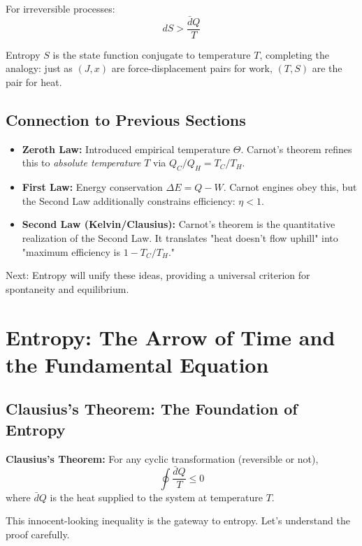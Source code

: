 \documentclass[9pt,twocoloumn]{article}
\begin{document}
For irreversible processes:
\begin{equation}
dS > \frac{\bar{d}Q}{T}
\end{equation}

Entropy $S$ is the state function conjugate to temperature $T$, completing the analogy: just as $(J, x)$ are force-displacement pairs for work, $(T, S)$ are the pair for heat.

\subsection{Connection to Previous Sections}

\begin{itemize}
    \item \textbf{Zeroth Law:} Introduced empirical temperature $\Theta$. Carnot's theorem refines this to \emph{absolute temperature} $T$ via $Q_C/Q_H = T_C/T_H$.
    \item \textbf{First Law:} Energy conservation $\Delta E = Q - W$. Carnot engines obey this, but the Second Law additionally constrains efficiency: $\eta < 1$.
    \item \textbf{Second Law (Kelvin/Clausius):} Carnot's theorem is the quantitative realization of the Second Law. It translates "heat doesn't flow uphill" into "maximum efficiency is $1 - T_C/T_H$."
\end{itemize}

Next: Entropy will unify these ideas, providing a universal criterion for spontaneity and equilibrium.

\section{Entropy: The Arrow of Time and the Fundamental Equation}

\subsection{Clausius's Theorem: The Foundation of Entropy}

\textbf{Clausius's Theorem:} For any cyclic transformation (reversible or not),
\begin{equation}
\boxed{\oint \frac{\bar{d}Q}{T} \leq 0}
\end{equation}
where $\bar{d}Q$ is the heat supplied to the system at temperature $T$.

This innocent-looking inequality is the gateway to entropy. Let's understand the proof carefully.
\end{document}
